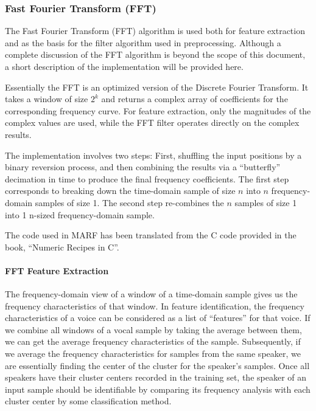 \subsubsection{Fast Fourier Transform (FFT)}\label{sect:fft}

The Fast Fourier Transform (FFT) algorithm is used both for feature extraction and as the basis for the
filter algorithm used in preprocessing.  Although a complete discussion of the
FFT algorithm is beyond the scope of this document, a short description of the
implementation will be provided here.

Essentially the FFT is an optimized version of the Discrete Fourier Transform.
It takes a window of size $2^{k}$ and returns a complex array of coefficients
for the corresponding frequency curve.  For feature extraction, only the
magnitudes of the complex values are used, while the FFT filter operates
directly on the complex results.

The implementation involves two steps: First, shuffling the input positions by a
binary reversion process, and then combining the results via a ``butterfly''
decimation in time to produce the final frequency coefficients.
The first step corresponds to breaking down the time-domain sample of size $n$
into $n$ frequency-domain samples of size 1.  The second step re-combines the $n$
samples of size 1 into 1 n-sized frequency-domain sample.

The code used in MARF has been translated from the C code provided in the book,
``Numeric Recipes in C''.

\paragraph{FFT Feature Extraction}

The frequency-domain view of a window of a time-domain sample gives us the
frequency characteristics of that window.  In feature identification, the
frequency characteristics of a voice can be considered as a list of ``features''
for that voice.  If we combine all windows of a vocal sample by
taking the average between them, we can get the average frequency
characteristics of the sample.  Subsequently, if we average the frequency
characteristics for samples from the same speaker, we are essentially finding
the center of the cluster for the speaker's samples.  Once all speakers have
their cluster centers recorded in the training set, the speaker of an
input sample should be identifiable by comparing its frequency analysis with
each cluster center by some classification method.

